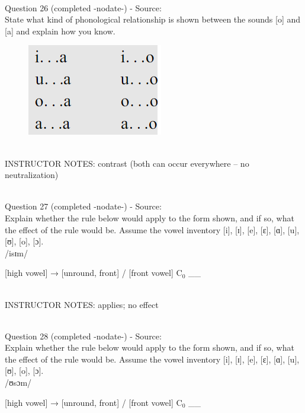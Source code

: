 \documentclass[12pt]{article}
\begin{document}
~\\

{\large Question 26} (completed -nodate-) - Source: \\

State what kind of phonological relationship is shown between the sounds [o] and [a] and explain how you know.\\

\begin{figure}[H]
\includegraphics{../images/peng70ao_d.png}
\end{figure}

~\\
INSTRUCTOR NOTES: contrast (both can occur everywhere -- no neutralization)


~\\

{\large Question 27} (completed -nodate-) - Source: \\

Explain whether the rule below would apply to the form shown, and if so, what the effect of the rule would be. Assume the vowel inventory [i], [ɪ], [e], [ɛ], [ɑ], [u], [ʊ], [o], [ɔ].\\

/isɪm/

{[high vowel]} →  {[unround, front]} / {[front vowel]} C$_0$ \_\_ 


~\\
INSTRUCTOR NOTES: applies; no effect


~\\

{\large Question 28} (completed -nodate-) - Source: \\

Explain whether the rule below would apply to the form shown, and if so, what the effect of the rule would be. Assume the vowel inventory [i], [ɪ], [e], [ɛ], [ɑ], [u], [ʊ], [o], [ɔ].\\

/ʊsɔm/

{[high vowel]} →  {[unround, front]} / {[front vowel]} C$_0$ \_\_ 
\end{document}
